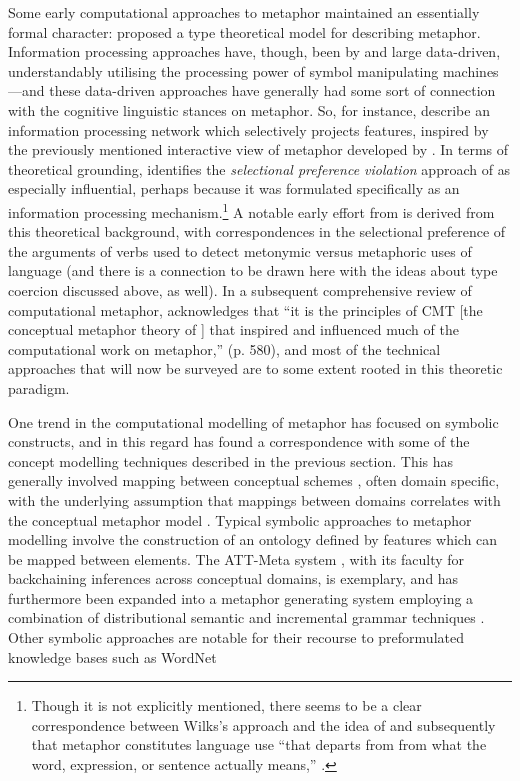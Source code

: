 Some early computational approaches to metaphor maintained an essentially formal character: \cite{vanGenabith2001} proposed a type theoretical model for describing metaphor.  Information processing approaches have, though, been by and large data-driven, understandably utilising the processing power of symbol manipulating machines---and these data-driven approaches have generally had some sort of connection with the cognitive linguistic stances on metaphor.  So, for instance, \cite{ThomasEA1999} describe an information processing network which selectively projects features, inspired by the previously mentioned interactive view of metaphor developed by \cite{Black1977}.  In terms of theoretical grounding, \cite{Shutova2010} identifies the \emph{selectional preference violation} approach of \cite{Wilks1978} as especially influential, perhaps because it was formulated specifically as an information processing mechanism.\footnote{Though it is not explicitly mentioned, there seems to be a clear correspondence between Wilks's approach and the idea of \cite{Grice} and subsequently \cite{Searle1979} that metaphor constitutes language use ``that departs from from what the word, expression, or sentence actually means,'' \citep[][p. 84]{Searle1979}.}  A notable early effort from \cite{Fass1991} is derived from this theoretical background, with correspondences in the selectional preference of the arguments of verbs used to detect metonymic versus metaphoric uses of language (and there is a connection to be drawn here with the ideas about type coercion discussed above, as well). In a subsequent comprehensive review of computational metaphor, \cite{Shutova2015} acknowledges that ``it is the principles of CMT [the conceptual metaphor theory of \cite{LakoffEA1980}] that inspired and influenced much of the computational work on metaphor,'' (p. 580), and most of the technical approaches that will now be surveyed are to some extent rooted in this theoretic paradigm.

One trend in the computational modelling of metaphor has focused on symbolic constructs, and in this regard has found a correspondence with some of the concept modelling techniques described in the previous section.  This has generally involved mapping between conceptual schemes \citep{Indurkhya1997}, often domain specific, with the underlying assumption that mappings between domains correlates with the conceptual metaphor model \citep{Narayanan1999}.  Typical symbolic approaches to metaphor modelling involve the construction of an ontology defined by features which can be mapped between elements.  The ATT-Meta system \citep{LeeEA2001}, with its faculty for backchaining inferences across conceptual domains, is exemplary, and has furthermore been expanded into a metaphor generating system employing a combination of distributional semantic and incremental grammar techniques \citep{GargettEA2013}.  Other symbolic approaches are notable for their recourse to preformulated knowledge bases such as WordNet

